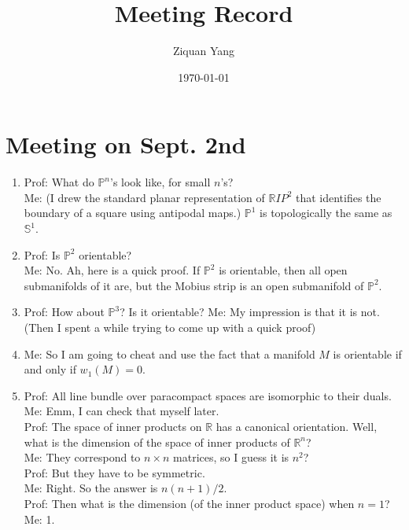 \documentclass[12pt]{article}
\theoremstyle{plain}
\theoremstyle{definition}
\newcommand{\IP}{\mathbb{P}}
\newcommand{\IR}{\mathbb{R}}
\newcommand{\IS}{\mathbb{S}}
\newcommand{\<}{\langle}
\renewcommand{\>}{\rangle}
\begin{document}
\title{Meeting Record}
\author{Ziquan Yang}


\date{\today}

\maketitle
 
\tableofcontents

\section{Meeting on Sept. 2nd}
\begin{enumerate}
\item Prof: What do $\IP^n$'s look like, for small $n$'s? \\
Me: (I drew the standard planar representation of $\IR IP^2$ that identifies the boundary of a square using antipodal maps.) $\IP^1$ is topologically the same as $\IS^1$. 

\item Prof: Is $\IP^2$ orientable? \\
Me: No. Ah, here is a quick proof. If $\IP^2$ is orientable, then all open submanifolds of it are, but the Mobius strip is an open submanifold of $\IP^2$. 

\item Prof: How about $\IP^3$? Is it orientable?
Me: My impression is that it is not. (Then I spent a while trying to come up with a quick proof)

\item Me: So I am going to cheat and use the fact that a manifold $M$ is orientable if and only if $w_1(M) = 0$. 

\item Prof: All line bundle over paracompact spaces are isomorphic to their duals. \\
Me: Emm, I can check that myself later. \\
Prof: The space of inner products on $\IR$ has a canonical orientation. Well, what is the dimension of the space of inner products of $\IR^n$? \\
Me: They correspond to $n \times n$ matrices, so I guess it is $n^2$?\\
Prof: But they have to be symmetric. \\
Me: Right. So the answer is $n(n+1)/2$. \\
Prof: Then what is the dimension (of the inner product space) when $n = 1$?
Me: 1. 


\end{enumerate}
\end{document}

